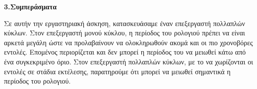 { \large \bfseries 3.Συμπεράσματα}\\ %

\begin{justify}
    Σε αυτήν την εργαστηριακή άσκηση, κατασκευάσαμε έναν επεξεργαστή 
    πολλαπλών κύκλων. Στον επεξεργαστή μονού κύκλου, η περίοδος του ρολογιού
    πρέπει να είναι αρκετά μεγάλη ώστε να προλαβαίνουν να ολοκληρωθούν
    ακομά και οι πιο χρονοβόρες εντολές. Επομένος περιορίζεται και δεν μπορεί
    η περίοδος του να μειωθεί κάτω από ένα συγκεκριμένο όριο. Στον επεξεργαστή
    πολλαπλών κύκλων, με το να χωρίζονται οι εντολές σε στάδια εκτέλεσης,
    παρατηρούμε ότι μπορεί να μειωθεί σημαντικά η περίοδος του ρολογιού.
\end{justify}

